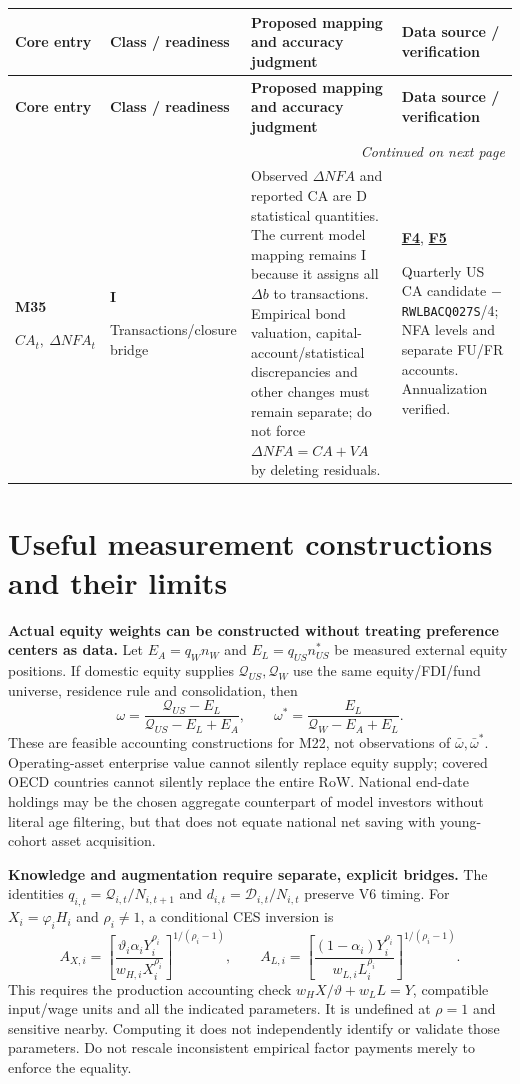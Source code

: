 \documentclass[10pt,a4paper,landscape]{article}
\makeatletter
\newcommand{\code}[1]{{\footnotesize\texttt{#1}}}
\newenvironment{measuretable}{%
\fontsize{9.4}{10.8}\selectfont\setlength{\parskip}{1pt}
\begin{longtable}{@{}P{\dimexpr .14\textwidth-4.2pt\relax}P{\dimexpr .135\textwidth-4.05pt\relax}P{\dimexpr .455\textwidth-13.65pt\relax}P{\dimexpr .27\textwidth-8.1pt\relax}@{}}
\toprule\rowcolor{tablehead}\textbf{Core entry} & \textbf{Class / readiness} & \textbf{Proposed mapping and accuracy judgment} & \textbf{Data source / verification}\\\midrule
\endfirsthead
\toprule\rowcolor{tablehead}\textbf{Core entry} & \textbf{Class / readiness} & \textbf{Proposed mapping and accuracy judgment} & \textbf{Data source / verification}\\\midrule
\endhead\midrule\multicolumn{4}{r}{\footnotesize\itshape Continued on next page}\\\endfoot
\bottomrule\endlastfoot
}{\end{longtable}}
\makeatother
\begin{document}
\begin{measuretable}
\textbf{M35}\par $CA_t,\ \Delta NFA_t$ & \textbf{I}\par Transactions/closure bridge & Observed $\Delta NFA$ and reported CA are D statistical quantities. The current model mapping remains I because it assigns all $\Delta b$ to transactions. Empirical bond valuation, capital-account/statistical discrepancies and other changes must remain separate; do not force $\Delta NFA=CA+VA$ by deleting residuals. & \hyperlink{src-F4}{\textbf{F4}}, \hyperlink{src-F5}{\textbf{F5}}\par Quarterly US CA candidate $-$\code{RWLBACQ027S}/4; NFA levels and separate FU/FR accounts. Annualization verified.\\[4pt]
\end{measuretable}


\clearpage
\section{Useful measurement constructions and their limits}\label{sec:bridges}
\textbf{Actual equity weights can be constructed without treating preference centers as data.}
Let $E_A=q_Wn_W$ and $E_L=q_{US}n_{US}^*$ be measured external equity positions. If domestic equity supplies $\mathcal Q_{US},\mathcal Q_W$ use the same equity/FDI/fund universe, residence rule and consolidation, then
\[
\omega=\frac{\mathcal Q_{US}-E_L}{\mathcal Q_{US}-E_L+E_A},\qquad
\omega^*=\frac{E_L}{\mathcal Q_W-E_A+E_L}.
\]
These are feasible accounting constructions for M22, not observations of $\bar\omega,\bar\omega^*$. Operating-asset enterprise value cannot silently replace equity supply; covered OECD countries cannot silently replace the entire RoW. National end-date holdings may be the chosen aggregate counterpart of model investors without literal age filtering, but that does not equate national net saving with young-cohort asset acquisition.

\textbf{Knowledge and augmentation require separate, explicit bridges.}
The identities $q_{i,t}=\mathcal Q_{i,t}/N_{i,t+1}$ and $d_{i,t}=\mathcal D_{i,t}/N_{i,t}$ preserve V6 timing. For $X_i=\varphi_iH_i$ and $\rho_i\ne1$, a conditional CES inversion is
\[
A_{X,i}=\left[\frac{\vartheta_i\alpha_iY_i^{\rho_i}}{w_{H,i}X_i^{\rho_i}}\right]^{1/(\rho_i-1)},\qquad
A_{L,i}=\left[\frac{(1-\alpha_i)Y_i^{\rho_i}}{w_{L,i}L_i^{\rho_i}}\right]^{1/(\rho_i-1)}.
\]
This requires the production accounting check $w_HX/\vartheta+w_LL=Y$, compatible input/wage units and all the indicated parameters. It is undefined at $\rho=1$ and sensitive nearby. Computing it does not independently identify or validate those parameters. Do not rescale inconsistent empirical factor payments merely to enforce the equality.
\end{document}
